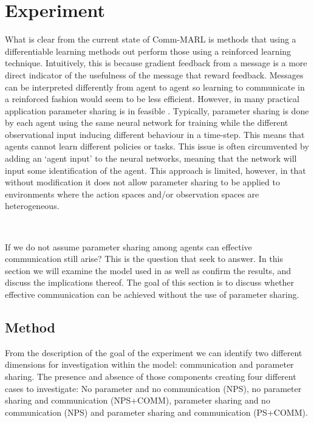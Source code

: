 \documentclass{article}
\begin{document}
\newpage

\section{Experiment}

What is clear from the current state of Comm-MARL is methods that using a differentiable learning methods out perform those using a reinforced learning technique. Intuitively, this is because gradient feedback from a message is a more direct indicator of the usefulness of the message that reward feedback. Messages can be interpreted differently from agent to agent so learning to communicate in a reinforced fashion would seem to be less efficient. However, in many practical application parameter sharing is in feasible \citep{wong2022deep}. Typically, parameter sharing is done by each agent using the same neural network for training while the different observational input inducing different behaviour in a time-step. This means that agents cannot learn different policies or tasks. \citep{terry2023revisiting} This issue is often circumvented by adding an `agent input' to the neural networks, meaning that the network will input some identification of the agent. This approach is limited, however, in that without modification it does not allow parameter sharing to be applied to environments where the action spaces and/or observation spaces are heterogeneous.  

\

If we do not assume parameter sharing among agents can effective communication still arise? This is the question that \citet{pina2024fully} seek to answer. In this section we will examine the model used in \citet{pina2024fully} as well as  confirm the results, and discuss the implications thereof. The goal of this section is to discuss whether effective communication can be achieved without the use of parameter sharing.

\subsection{Method}

From the description of the goal of the experiment we can identify two different dimensions for investigation within the model: communication and parameter sharing. The presence and absence of those components creating four different cases to investigate: No parameter and no communication (NPS), no parameter sharing and communication (NPS+COMM), parameter sharing and no communication (NPS) and parameter sharing and communication (PS+COMM).
\end{document}
